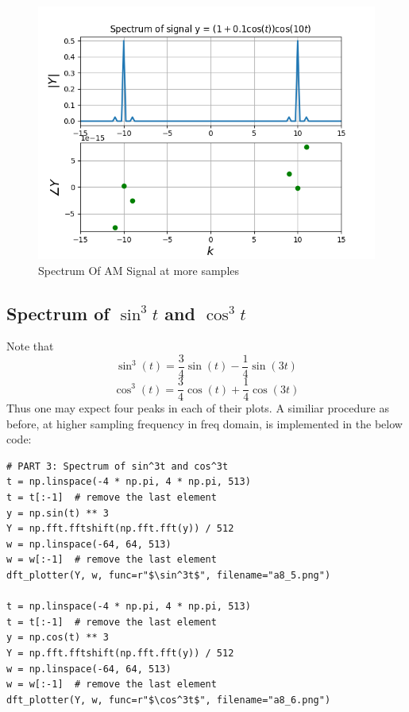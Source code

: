 \documentclass[11pt, a4paper]{article}
\begin{document}
\begin{figure}[!tbh]
   	\centering
  \includegraphics[scale=0.5]{a8_4.png} 
    \caption{Spectrum Of AM Signal at more samples} 	
   \end{figure} 


\subsection{Spectrum of $\sin^3t$ and $\cos^3t$}
Note that 
\begin{equation*}
    \sin^3(t) = \frac{3}{4}\sin(t) - \frac{1}{4}\sin(3t)
\end{equation*}
\begin{equation*}
    \cos^3(t) = \frac{3}{4}\cos(t) + \frac{1}{4}\cos(3t)
\end{equation*}
Thus one may expect four peaks in each of their plots. A similiar procedure as before, at higher sampling frequency in freq domain, is implemented in the below code:
\begin{verbatim}
# PART 3: Spectrum of sin^3t and cos^3t
t = np.linspace(-4 * np.pi, 4 * np.pi, 513)
t = t[:-1]  # remove the last element
y = np.sin(t) ** 3
Y = np.fft.fftshift(np.fft.fft(y)) / 512
w = np.linspace(-64, 64, 513)
w = w[:-1]  # remove the last element
dft_plotter(Y, w, func=r"$\sin^3t$", filename="a8_5.png")

t = np.linspace(-4 * np.pi, 4 * np.pi, 513)
t = t[:-1]  # remove the last element
y = np.cos(t) ** 3
Y = np.fft.fftshift(np.fft.fft(y)) / 512
w = np.linspace(-64, 64, 513)
w = w[:-1]  # remove the last element
dft_plotter(Y, w, func=r"$\cos^3t$", filename="a8_6.png")
\end{verbatim}
\end{document}
